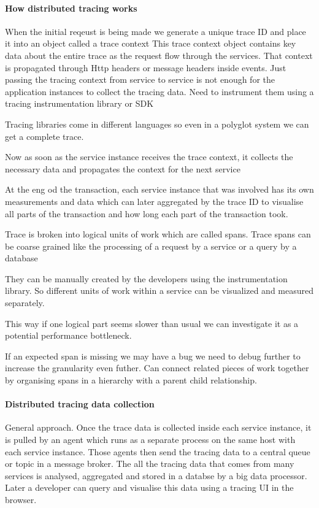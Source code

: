 \documentclass[a4paper, 11pt]{book}
\begin{document}
    \paragraph{How distributed tracing works}
    When the initial reqeust is being made we generate a unique trace ID and place it into an object called a trace context
    This trace context object contains key data about the entire trace as the request flow through the services.
    That context is propagated through Http headers or message headers inside events.
    Just passing the tracing context from service to service is not enough for the application instances to collect the tracing data.
    Need to instrument them using a tracing instrumentation library or SDK

    Tracing libraries come in different languages so even in a polyglot system we can get a complete trace.

    Now as soon as the service instance receives the trace context, it collects the necessary data and propagates the context for the next service

    At the eng od the transaction, each service instance that was involved has its own measurements and data which can later aggregated by the trace ID to visualise all parts of the transaction and how long each part of the transaction took.

    Trace is broken into logical units of work which are called spans.
    Trace spans can be coarse grained like the processing of a request by a service or a query by a database

    They can be manually created by the developers using the instrumentation library.
    So different units of work within a service can be visualized and measured separately.

    This way if one logical part seems slower than usual we can investigate it as a potential performance bottleneck.

    If an expected span is missing we may have a bug we need to debug further to increase the granularity even futher.
    Can connect related pieces of work together by organising spans in a hierarchy with a parent child relationship.

    \paragraph{Distributed tracing data collection}
    General approach.
    Once the trace data is collected inside each service instance, it is pulled by an agent which runs as a separate process on the same host with each service instance.
    Those agents then send the tracing data to a central queue or topic in a message broker.
    The all the tracing data that comes from many services is analysed, aggregated and stored in a databse by a big data processor.
    Later a developer can query and visualise this data using a tracing UI in the browser.
\end{document}
